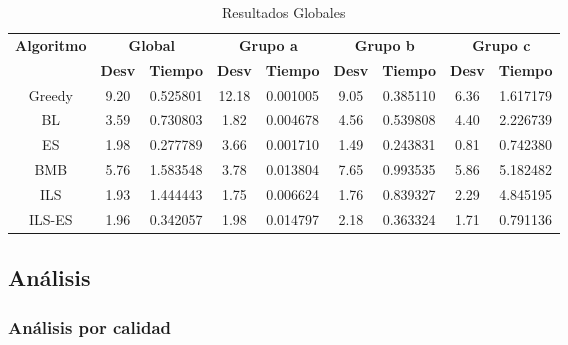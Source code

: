 \documentclass[10pt,a4paper]{article}
\begin{document}
\begin{table}[]
	\centering
	\begin{tabular}{|c|c|c|c|c|c|c|c|c|}
		\hline
		\multirow{2}{*}{\textbf{Algoritmo}} & \multicolumn{2}{c|}{\textbf{Global}} & \multicolumn{2}{c|}{\textbf{Grupo a}} & \multicolumn{2}{c|}{\textbf{Grupo b}} & \multicolumn{2}{c|}{\textbf{Grupo c}} \\ \cline{2-9} 
		& \textbf{Desv}    & \textbf{Tiempo}   & \textbf{Desv}    & \textbf{Tiempo}    & \textbf{Desv}    & \textbf{Tiempo}    & \textbf{Desv}    & \textbf{Tiempo}    \\ \hline
		Greedy                              & 9.20             & 0.525801          & 12.18            & 0.001005           & 9.05             & 0.385110           & 6.36             & 1.617179           \\ \hline
		BL                                  & 3.59             & 0.730803          & 1.82             & 0.004678           & 4.56             & 0.539808           & 4.40             & 2.226739           \\ \hline
		ES                                  & 1.98             & 0.277789          & 3.66             & 0.001710           & 1.49             & 0.243831           & 0.81             & 0.742380           \\ \hline
		BMB                                 & 5.76             & 1.583548          & 3.78             & 0.013804           & 7.65             & 0.993535           & 5.86             & 5.182482           \\ \hline
		ILS                                 & 1.93             & 1.444443          & 1.75             & 0.006624           & 1.76             & 0.839327           & 2.29             & 4.845195           \\ \hline
		ILS-ES                              & 1.96             & 0.342057          & 1.98             & 0.014797           & 2.18             & 0.363324           & 1.71             & 0.791136           \\ \hline
	\end{tabular}
	\caption{Resultados Globales}
	\label{table:resultados_globales}
\end{table}


\newpage

\subsection{Análisis}

\subsubsection{Análisis por calidad}
\end{document}

